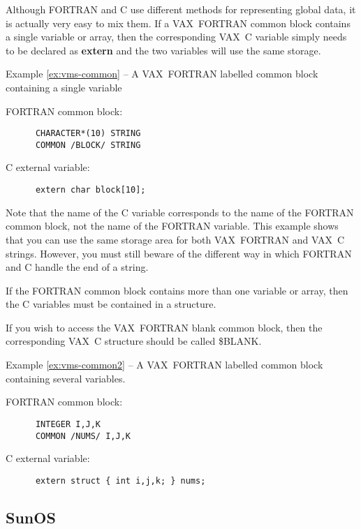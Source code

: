 Although FORTRAN and C use different methods for representing global data, it is
actually very easy to mix them. If a VAX~FORTRAN common block contains a single
variable or array, then the corresponding VAX~C variable simply needs to be
declared as {\bf extern} and the two variables will use the same storage. 

\label{ex:vms-common}
\begin{center}
Example \ref{ex:vms-common} -- A VAX~FORTRAN labelled common block containing a
single variable
\end{center}
\nopagebreak[4]
FORTRAN common block:
{\small \begin{verbatim}
      CHARACTER*(10) STRING
      COMMON /BLOCK/ STRING
\end{verbatim} }

C external variable:
{\small \begin{verbatim}
      extern char block[10];
\end{verbatim} }

Note that the name of the C variable corresponds to the name of the FORTRAN
common block, not the name of the FORTRAN variable. This example shows that you
can use the same storage area for both VAX~FORTRAN and VAX~C strings. However, you must
still beware of the different way in which FORTRAN and C handle the end of
a string.

If the FORTRAN common block contains more than one variable or array, then the 
C variables must be contained in a structure.

If you wish to access the VAX~FORTRAN blank common block, then the
corresponding VAX~C structure should be called \$BLANK.

\label{ex:vms-common2}
\begin{center}
Example \ref{ex:vms-common2} -- A VAX~FORTRAN labelled common block containing
several variables.
\end{center}
\nopagebreak[4]
FORTRAN common block:
{\small \begin{verbatim}
      INTEGER I,J,K
      COMMON /NUMS/ I,J,K
\end{verbatim} }

C external variable:
{\small \begin{verbatim}
      extern struct { int i,j,k; } nums;
\end{verbatim} }

\subsection{SunOS}

